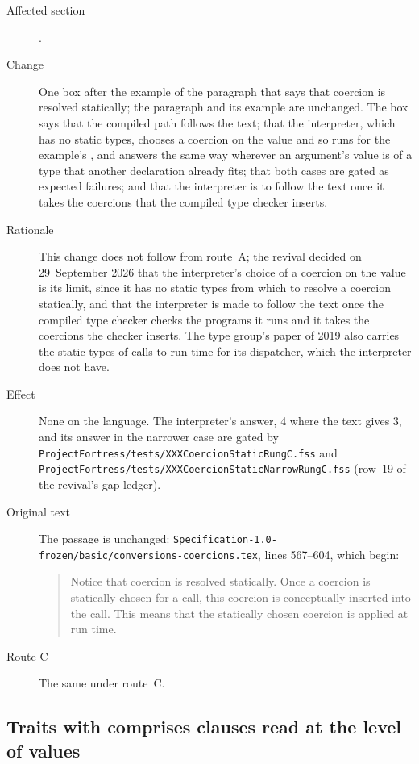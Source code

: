 \begin{description}
\item[Affected section] .
\item[Change] One box after the example of the paragraph that says that
coercion is resolved statically; the paragraph and its example are unchanged.
The box says that the compiled path follows the text; that the interpreter,
which has no static types, chooses a coercion on the value and so runs
 for the example's , and answers the same way wherever an
argument's value is of a type that another declaration already fits; that both
cases are gated as expected failures; and that the interpreter is to follow the
text once it takes the coercions that the compiled type checker inserts.
\item[Rationale] This change does not follow from route~A; the revival decided
on 29~September 2026 that the interpreter's choice of a coercion on the value is
its limit, since it has no static types from which to resolve a coercion
statically, and that the interpreter is made to follow the text once the
compiled type checker checks the programs it runs and it takes the coercions the
checker inserts.
The type group's paper of 2019 also carries the static types of calls to run
time for its dispatcher, which the interpreter does not have.
\item[Effect] None on the language.
The interpreter's answer, 4 where the text gives 3, and its answer in the
narrower case are gated by
\nolinkurl{ProjectFortress/tests/XXXCoercionStaticRungC.fss} and
\nolinkurl{ProjectFortress/tests/XXXCoercionStaticNarrowRungC.fss} (row~19 of
the revival's gap ledger).
\item[Original text] The passage is unchanged:
\nolinkurl{Specification-1.0-frozen/basic/conversions-coercions.tex}, lines
567--604, which begin:
\begin{quote}
Notice that coercion is resolved statically.  Once a coercion is statically
chosen for a call, this coercion is conceptually inserted into the call.
This means that the statically chosen coercion is applied at run time.
\end{quote}
\item[Route C] The same under route~C.
\end{description}

\subsection{Traits with comprises clauses read at the level of values}

